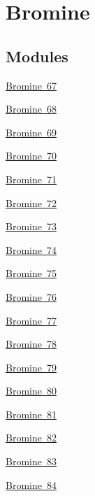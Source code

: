 \hypertarget{group___isotope_const-_bromine}{}\section{Bromine}
\label{group___isotope_const-_bromine}
\subsection*{Modules}
\begin{DoxyCompactItemize}
\item 
\mbox{\hyperlink{group___isotope_const-_bromine-_br67}{Bromine 67}}
\item 
\mbox{\hyperlink{group___isotope_const-_bromine-_br68}{Bromine 68}}
\item 
\mbox{\hyperlink{group___isotope_const-_bromine-_br69}{Bromine 69}}
\item 
\mbox{\hyperlink{group___isotope_const-_bromine-_br70}{Bromine 70}}
\item 
\mbox{\hyperlink{group___isotope_const-_bromine-_br71}{Bromine 71}}
\item 
\mbox{\hyperlink{group___isotope_const-_bromine-_br72}{Bromine 72}}
\item 
\mbox{\hyperlink{group___isotope_const-_bromine-_br73}{Bromine 73}}
\item 
\mbox{\hyperlink{group___isotope_const-_bromine-_br74}{Bromine 74}}
\item 
\mbox{\hyperlink{group___isotope_const-_bromine-_br75}{Bromine 75}}
\item 
\mbox{\hyperlink{group___isotope_const-_bromine-_br76}{Bromine 76}}
\item 
\mbox{\hyperlink{group___isotope_const-_bromine-_br77}{Bromine 77}}
\item 
\mbox{\hyperlink{group___isotope_const-_bromine-_br78}{Bromine 78}}
\item 
\mbox{\hyperlink{group___isotope_const-_bromine-_br79}{Bromine 79}}
\item 
\mbox{\hyperlink{group___isotope_const-_bromine-_br80}{Bromine 80}}
\item 
\mbox{\hyperlink{group___isotope_const-_bromine-_br81}{Bromine 81}}
\item 
\mbox{\hyperlink{group___isotope_const-_bromine-_br82}{Bromine 82}}
\item 
\mbox{\hyperlink{group___isotope_const-_bromine-_br83}{Bromine 83}}
\item 
\mbox{\hyperlink{group___isotope_const-_bromine-_br84}{Bromine 84}}

\end{DoxyCompactItemize}
